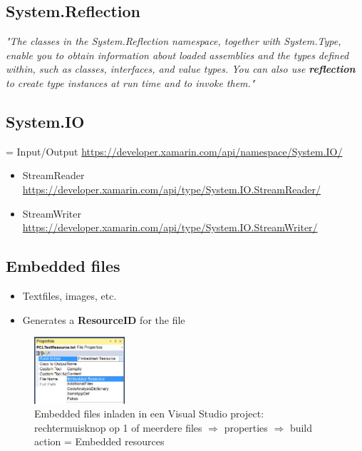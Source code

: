 \documentclass{article}
\newcommand{\bold}[1]{\textbf{#1}}
\begin{document}
\subsection{System.Reflection}

\textit{"The classes in the System.Reflection namespace, together with
System.Type, enable you to obtain information about loaded
assemblies and the types defined within, such as classes, interfaces,
and value types. You can also use \bold{reflection} to create type instances
at run time and to invoke them."}


\subsection{System.IO}

= Input/Output \url{https://developer.xamarin.com/api/namespace/System.IO/}

\begin{itemize}
    \item StreamReader \url{https://developer.xamarin.com/api/type/System.IO.StreamReader/}
    \item StreamWriter \url{https://developer.xamarin.com/api/type/System.IO.StreamWriter/}
\end{itemize}

\subsection{Embedded files}

\begin{itemize}
    \item Textfiles, images, etc.
    \item Generates a \bold{ResourceID} for the file
\end{itemize}

\begin{figure}[H]
    \centering
    \includegraphics[width=0.3\textwidth]{embedded-files0.png}
    \caption{Embedded files inladen in een Visual Studio project: rechtermuisknop op 1 of meerdere files $\Rightarrow$ properties $\Rightarrow$ build action = Embedded resources}
\end{figure}
\end{document}
